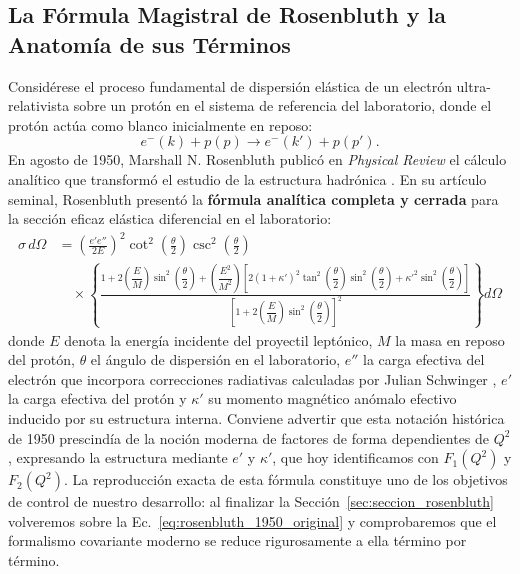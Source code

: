 \documentclass[10pt,a4paper]{article}
\begin{document}
\subsection{La Fórmula Magistral de Rosenbluth y la Anatomía de sus Términos}
Considérese el proceso fundamental de dispersión elástica de un electrón ultra-relativista sobre un protón en el sistema de referencia del laboratorio, donde el protón actúa como blanco inicialmente en reposo:
\begin{equation}
e^-(k) + p(p) \longrightarrow e^-(k') + p(p').
\label{eq:proceso_ep}
\end{equation}
En agosto de 1950, Marshall N. Rosenbluth publicó en \textit{Physical Review} el cálculo analítico que transformó el estudio de la estructura hadrónica \cite{rosenbluth1950}. En su artículo seminal, Rosenbluth presentó la \textbf{fórmula analítica completa y cerrada} para la sección eficaz elástica diferencial en el laboratorio:
\begin{equation}
\boxed{
\begin{aligned}
\sigma \, d\Omega &= \left(\frac{e' e''}{2E}\right)^2 \cot^2\left(\frac{\theta}{2}\right) \csc^2\left(\frac{\theta}{2}\right) \\
&\quad \times \left\{ \frac{1 + 2\left(\dfrac{E}{M}\right)\sin^2\left(\dfrac{\theta}{2}\right) + \left(\dfrac{E^2}{M^2}\right)\left[ 2(1+\kappa')^2 \tan^2\left(\dfrac{\theta}{2}\right)\sin^2\left(\dfrac{\theta}{2}\right) + {\kappa'}^2 \sin^2\left(\dfrac{\theta}{2}\right) \right]}{\left[1 + 2\left(\dfrac{E}{M}\right)\sin^2\left(\dfrac{\theta}{2}\right)\right]^2} \right\} d\Omega
\end{aligned}
}
\label{eq:rosenbluth_1950_original}
\end{equation}
donde $E$ denota la energía incidente del proyectil leptónico, $M$ la masa en reposo del protón, $\theta$ el ángulo de dispersión en el laboratorio, $e''$ la carga efectiva del electrón que incorpora correcciones radiativas calculadas por Julian Schwinger \cite{schwinger1949}, $e'$ la carga efectiva del protón y $\kappa'$ su momento magnético anómalo efectivo inducido por su estructura interna. Conviene advertir que esta notación histórica de 1950 prescindía de la noción moderna de factores de forma dependientes de $Q^2$, expresando la estructura mediante $e'$ y $\kappa'$, que hoy identificamos con $F_1(Q^2)$ y $F_2(Q^2)$. La reproducción exacta de esta fórmula constituye uno de los objetivos de control de nuestro desarrollo: al finalizar la Sección~\ref{sec:seccion_rosenbluth} volveremos sobre la Ec.~\eqref{eq:rosenbluth_1950_original} y comprobaremos que el formalismo covariante moderno se reduce rigurosamente a ella término por término.
\end{document}
